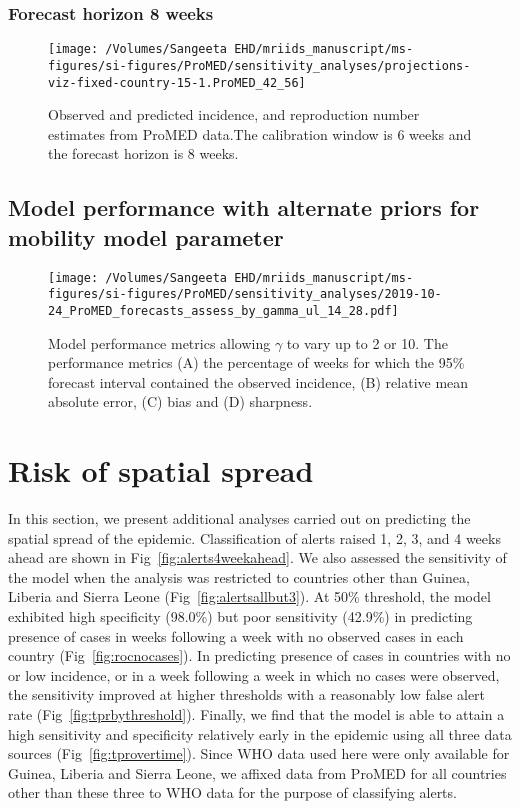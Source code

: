\documentclass[9pt,twoside,lineno]{pnas-new}
\begin{document}
\subsubsection{Forecast horizon 8 weeks}\label{forecast-horizon-8-weeks-11}

\begin{figure}
    \centering
    \texttt{[image: /Volumes/Sangeeta EHD/mriids\_manuscript/ms-figures/si-figures/ProMED/sensitivity\_analyses/projections-viz-fixed-country-15-1.ProMED\_42\_56]} 
  \caption{Observed and predicted incidence, and reproduction number
    estimates from ProMED data.The calibration window is 6 weeks and
    the forecast horizon is 8 weeks.}
  \label{fig:pm68ul10}
\end{figure}\FloatBarrier


\subsection{Model performance with alternate priors for mobility
  model parameter}\label{model-performance-with-alternate-priors-for-mobility-model-parameter}

\begin{figure}
    \centering
    \texttt{[image: /Volumes/Sangeeta EHD/mriids\_manuscript/ms-figures/si-figures/ProMED/sensitivity\_analyses/2019-10-24\_ProMED\_forecasts\_assess\_by\_gamma\_ul\_14\_28.pdf]} 
  \caption{Model performance metrics allowing $\gamma$ to vary up to
    2 or 10. The performance metrics (A) the percentage of weeks for
    which the 95\% forecast interval contained the observed incidence,
    (B) relative mean absolute error, (C) bias and (D) sharpness.}\label{fig:perfbygamma}
\end{figure}\FloatBarrier

\section{Risk of spatial spread}\label{sec:spatial-spread}

In this section, we present additional analyses carried out on
predicting the spatial spread of the epidemic. Classification of
alerts raised 1, 2, 3, and 4 weeks ahead are shown in
Fig~\ref{fig:alerts4weekahead}. We also assessed the sensitivity
of the model when the analysis was restricted to countries other than
Guinea, Liberia and Sierra Leone (Fig~\ref{fig:alertsallbut3}). At
50\% threshold, the
model exhibited high specificity (98.0\%) but poor sensitivity (42.9\%) in predicting 
presence of cases in weeks following a week with no observed cases in each
country (Fig~\ref{fig:rocnocases}). In predicting presence of cases in
countries with no or low incidence, or in a
week following a week in which no cases were observed, the sensitivity
improved at higher thresholds with a reasonably low false alert rate
(Fig~\ref{fig:tprbythreshold}). Finally, we find that the model is
able to attain a high sensitivity and specificity relatively early in 
the epidemic using all three data sources (Fig~\ref{fig:tprovertime}).
Since WHO data used here were only available for Guinea, Liberia and
Sierra Leone, we affixed data from ProMED for all countries other than
these three to WHO data for the purpose of classifying alerts.
 
\end{document}
